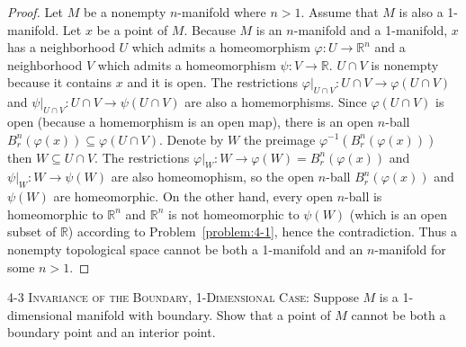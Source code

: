 \begin{proof}
	Let $M$ be a nonempty $n$-manifold where $n > 1$. Assume that $M$ is also a 1-manifold. Let $x$ be a point of $M$. Because $M$ is an $n$-manifold and a 1-manifold, $x$ has a neighborhood $U$ which admits a homeomorphism $\varphi: U\to \mathbb{R}^{n}$ and a neighborhood $V$ which admits a homeomorphism $\psi: V\to \mathbb{R}$. $U\cap V$ is nonempty because it contains $x$ and it is open. The restrictions $\varphi\vert_{U\cap V}: U\cap V \to \varphi(U\cap V)$ and $\psi\vert_{U\cap V}: U\cap V \to \psi(U\cap V)$ are also a homemorphisms. Since $\varphi(U\cap V)$ is open (because a homemorphism is an open map), there is an open $n$-ball $B^{n}_{r}(\varphi(x)) \subseteq \varphi(U\cap V)$. Denote by $W$ the preimage $\varphi^{-1}(B^{n}_{r}(\varphi(x)))$ then $W\subseteq U\cap V$. The restrictions $\varphi\vert_{W}: W \to \varphi(W) = B^{n}_{r}(\varphi(x))$ and $\psi\vert_{W}: W \to \psi(W)$ are also homeomophism, so the open $n$-ball $B^{n}_{r}(\varphi(x))$ and $\psi(W)$ are homeomorphic. On the other hand, every open $n$-ball is homeomorphic to $\mathbb{R}^{n}$ and $\mathbb{R}^{n}$ is not homeomorphic to $\psi(W)$ (which is an open subset of $\mathbb{R}$) according to Problem~\ref{problem:4-1}, hence the contradiction. Thus a nonempty topological space cannot be both a 1-manifold and an $n$-manifold for some $n > 1$.
\end{proof}

\begin{problem}{4-3}
\textsc{Invariance of the Boundary, 1-Dimensional Case:} Suppose $M$ is a 1-dimensional manifold with boundary. Show that a point of $M$ cannot be both a boundary point and an interior point.
\end{problem}

